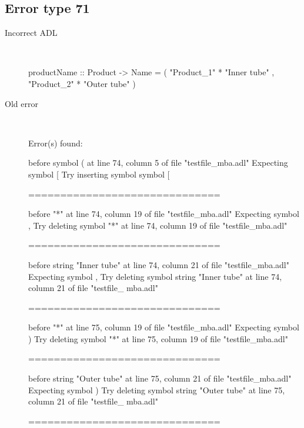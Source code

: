 \hrulefill

\subsection{Error type 71}
  \begin{description}
  \item[Incorrect ADL]~\\
\begin{adl}
productName :: Product -> Name
  = ( "Product_1" * "Inner tube"
    , "Product_2" * "Outer tube"
    )\end{adl}
  \item[Old error]~\\
\begin{haskell}
Error(s) found:

before symbol ( at line 74, column 5 of file "testfile_mba.adl"
Expecting symbol [
Try inserting symbol symbol [

==============================

before "*" at line 74, column 19 of file "testfile_mba.adl"
Expecting symbol ,
Try deleting symbol "*" at line 74, column 19 of file "testfile_mba.adl"

==============================

before string "Inner tube" at line 74, column 21 of file "testfile_mba.adl"
Expecting symbol ,
Try deleting symbol string "Inner tube" at line 74, column 21 of file "testfile_
mba.adl"

==============================

before "*" at line 75, column 19 of file "testfile_mba.adl"
Expecting symbol )
Try deleting symbol "*" at line 75, column 19 of file "testfile_mba.adl"

==============================

before string "Outer tube" at line 75, column 21 of file "testfile_mba.adl"
Expecting symbol )
Try deleting symbol string "Outer tube" at line 75, column 21 of file "testfile_
mba.adl"

==============================


\end{haskell}
\end{description}
